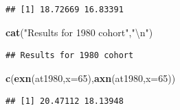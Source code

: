\documentclass[ignorenonframetext,]{beamer}
\newenvironment{Shaded}{\begin{snugshade}}{\end{snugshade}}
\newcommand{\KeywordTok}[1]{\textcolor[rgb]{0.13,0.29,0.53}{\textbf{{#1}}}}
\newcommand{\DataTypeTok}[1]{\textcolor[rgb]{0.13,0.29,0.53}{{#1}}}
\newcommand{\DecValTok}[1]{\textcolor[rgb]{0.00,0.00,0.81}{{#1}}}
\newcommand{\CharTok}[1]{\textcolor[rgb]{0.31,0.60,0.02}{{#1}}}
\newcommand{\StringTok}[1]{\textcolor[rgb]{0.31,0.60,0.02}{{#1}}}
\newcommand{\NormalTok}[1]{{#1}}
\begin{document}
\begin{frame}[fragile]
\begin{verbatim}
## [1] 18.72669 16.83391
\end{verbatim}

\begin{Shaded}
\begin{Highlighting}[]
\KeywordTok{cat}\NormalTok{(}\StringTok{"Results for 1980 cohort"}\NormalTok{,}\StringTok{"}\CharTok{\textbackslash{}n}\StringTok{"}\NormalTok{)}
\end{Highlighting}
\end{Shaded}

\begin{verbatim}
## Results for 1980 cohort
\end{verbatim}

\begin{Shaded}
\begin{Highlighting}[]
\KeywordTok{c}\NormalTok{(}\KeywordTok{exn}\NormalTok{(at1980,}\DataTypeTok{x=}\DecValTok{65}\NormalTok{),}\KeywordTok{axn}\NormalTok{(at1980,}\DataTypeTok{x=}\DecValTok{65}\NormalTok{))}
\end{Highlighting}
\end{Shaded}

\begin{verbatim}
## [1] 20.47112 18.13948
\end{verbatim}

\end{frame}
\end{document}
